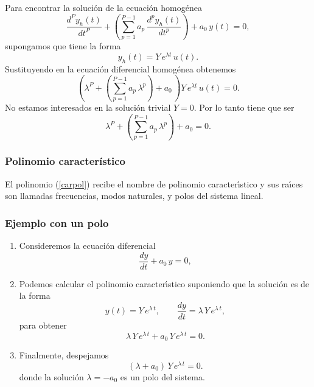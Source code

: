 \documentclass[11pt,a4paper,openany]{book}
\begin{document}
Para encontrar la soluci\'{o}n de la ecuaci\'{o}n homog\'{e}nea 
\begin{equation}
	\frac{d^{P}y_{h}\left( t\right) }{dt^{P}} +
	\left(\sum_{p=1}^{P-1}a_{p} \, \frac{d^{p}y_{h}\left( t\right) }{dt^{p}}\right) + a_{0} \, y(t)=0,
\end{equation}
supongamos que tiene la forma 
\begin{equation}
	y_{h}\left( t\right) = Y \, e^{\lambda t} \, u(t).
\end{equation}
Sustituyendo en la ecuaci\'{o}n diferencial homog\'{e}nea obtenemos 
\begin{equation}
	\left(\lambda^{P} + \left(
	\sum_{p=1}^{P-1}a_{p} \, \lambda^{p}\right) + a_{0} \, \right) Y \, e^{\lambda t} \, u(t) = 0.
\end{equation}
No estamos interesados en la soluci\'{o}n trivial $Y=0$. Por lo tanto tiene que ser 
\begin{equation}
	\lambda^{P} + \left(\sum_{p=1}^{P-1}a_{p} \, \lambda^{p}\right) + a_{0} = 0. \label{carpol}
\end{equation}

\subsubsection{Polinomio característico}

El polinomio (\ref{carpol}) recibe el nombre de polinomio caracter\'{\i}stico y sus ra\'{\i}ces son llamadas frecuencias, modos naturales, y polos del sistema lineal.

\subsubsection{Ejemplo con un polo}

\begin{enumerate}
	\item Consideremos la ecuaci\'{o}n diferencial 
	\begin{equation}
		\frac{dy}{dt}+a_{0} \, y = 0,
	\end{equation}
	
	\item Podemos calcular el polinomio caracter\'{\i}stico suponiendo que la soluci\'{o}n es de la forma
	\begin{equation}
		y\left( t\right) = Y \, e^{\lambda \, t}, \qquad
		\frac{dy}{dt}=\lambda \, Y \, e^{\lambda \, t},
	\end{equation}
	para obtener 
	\begin{equation}
		\lambda \, Y \, e^{\lambda \, t}+a_{0} \, Y \, e^{\lambda \, t}= 0.
	\end{equation}
	
	\item Finalmente, despejamos
	\begin{equation}
		\left(\lambda +a_{0} \right) \, Y \, e^{\lambda \, t}= 0.
	\end{equation}
	donde la soluci\'{o}n $\lambda = - a_{0}$ es un polo del sistema.
\end{enumerate}
\end{document}
